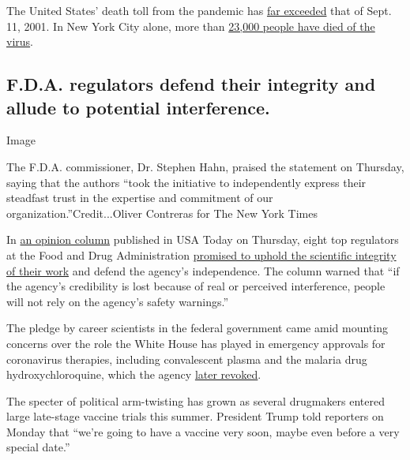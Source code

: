 The United States' death toll from the pandemic has
\href{https://www.nytimes3xbfgragh.onion/interactive/2020/us/coronavirus-us-cases.htmlhttps://www.nytimes3xbfgragh.onion/interactive/2020/us/coronavirus-us-cases.html}{far
exceeded} that of Sept. 11, 2001. In New York City alone, more than
\href{https://www.nytimes3xbfgragh.onion/interactive/2020/nyregion/new-york-city-coronavirus-cases.html}{23,000
people have died of the virus}.

\hypertarget{fda-regulators-defend-their-integrity-and-allude-to-potential-interference}{%
\subsection{F.D.A. regulators defend their integrity and allude to
potential
interference.}\label{fda-regulators-defend-their-integrity-and-allude-to-potential-interference}}

Image

The F.D.A. commissioner, Dr. Stephen Hahn, praised the statement on
Thursday, saying that the authors ``took the initiative to independently
express their steadfast trust in the expertise and commitment of our
organization.''Credit...Oliver Contreras for The New York Times

In
\href{https://www.usatoday.com/story/opinion/2020/09/10/sound-science-to-meet-covid-challenges-fda-career-officials-column/5756948002/}{an
opinion column} published in USA Today on Thursday, eight top regulators
at the Food and Drug Administration
\href{https://www.nytimes3xbfgragh.onion/2020/09/10/us/politics/fda-coronavirus-vaccine.html}{promised
to uphold the scientific integrity of their work} and defend the
agency's independence. The column warned that ``if the agency's
credibility is lost because of real or perceived interference, people
will not rely on the agency's safety warnings.''

The pledge by career scientists in the federal government came amid
mounting concerns over the role the White House has played in emergency
approvals for coronavirus therapies, including convalescent plasma and
the malaria drug hydroxychloroquine, which the agency
\href{https://www.nytimes3xbfgragh.onion/2020/06/15/health/fda-hydroxychloroquine-malaria.html}{later
revoked}.

The specter of political arm-twisting has grown as several drugmakers
entered large late-stage vaccine trials this summer. President Trump
told reporters on Monday that ``we're going to have a vaccine very soon,
maybe even before a very special date.''

